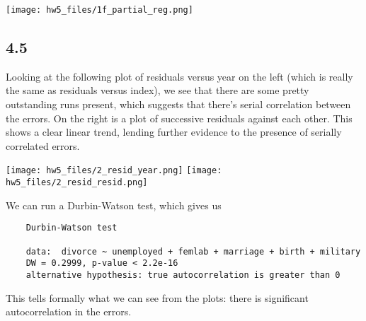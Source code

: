 \documentclass{article}
\begin{document}
\texttt{[image: hw5\_files/1f\_partial\_reg.png]}

\subsection*{4.5}
Looking at the following plot of residuals versus year on the left (which is really the same as residuals versus index), we see that there are some pretty outstanding runs present, which suggests that there's serial correlation between the errors. On the right is a plot of successive residuals against each other. This shows a clear linear trend, lending further evidence to the presence of serially correlated errors.

\texttt{[image: hw5\_files/2\_resid\_year.png]}
\texttt{[image: hw5\_files/2\_resid\_resid.png]}

We can run a Durbin-Watson test, which gives us 
\begin{verbatim}
    Durbin-Watson test

    data:  divorce ~ unemployed + femlab + marriage + birth + military
    DW = 0.2999, p-value < 2.2e-16
    alternative hypothesis: true autocorrelation is greater than 0
\end{verbatim}
This tells formally what we can see from the plots: there is significant autocorrelation in the errors.
\end{document}
